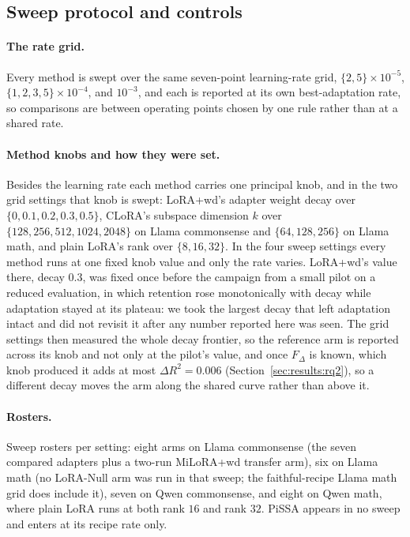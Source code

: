 \documentclass[11pt]{article}
\newcommand{\dw}{F_{\Delta}}
\begin{document}
\subsection{Sweep protocol and controls}\label{app:sweep}

\paragraph{The rate grid.} Every method is swept over the same seven-point
learning-rate grid, $\{2,5\}\times10^{-5}$, $\{1,2,3,5\}\times10^{-4}$, and
$10^{-3}$, and each is reported at its own best-adaptation rate, so
comparisons are between operating points chosen by one rule rather than at a
shared rate.

\paragraph{Method knobs and how they were set.} Besides the learning
rate each method carries one principal knob, and in the two grid settings
that knob is swept: LoRA{+}wd's adapter weight decay over
$\{0, 0.1, 0.2, 0.3, 0.5\}$, CLoRA's subspace dimension $k$ over
$\{128, 256, 512, 1024, 2048\}$ on Llama commonsense and
$\{64, 128, 256\}$ on Llama math, and plain LoRA's rank over
$\{8, 16, 32\}$. In the four sweep settings every method runs at one fixed
knob value and only the rate varies. LoRA{+}wd's value there, decay $0.3$, was fixed once
before the campaign from a small pilot on a reduced evaluation, in which
retention rose monotonically with decay while adaptation stayed at its
plateau: we took the largest decay that left adaptation intact and did not
revisit it after any number reported here was seen. The grid settings then
measured the whole decay frontier, so the reference arm is reported across its
knob and not only at the pilot's value, and once $\dw$ is known, which knob
produced it adds at most $\Delta R^2 = 0.006$
(Section~\ref{sec:results:rq2}), so a different decay moves the arm along the
shared curve rather than above it.

\paragraph{Rosters.} Sweep rosters per setting: eight arms on Llama
commonsense (the seven compared adapters plus a two-run MiLoRA{+}wd transfer
arm), six on Llama math (no LoRA-Null arm was run in that sweep; the
faithful-recipe Llama math grid does include it), seven on Qwen commonsense,
and eight on Qwen math, where plain LoRA runs at both rank $16$ and rank $32$.
PiSSA appears in no sweep and enters at its recipe rate only.
\end{document}
